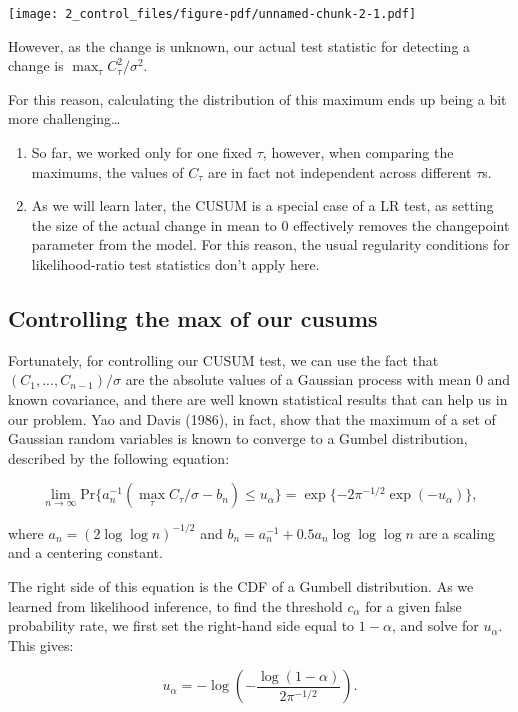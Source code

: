 \documentclass[
  letterpaper,
  DIV=11,
  numbers=noendperiod]{scrreprt}
\providecommand{\tightlist}{%
  \setlength{\itemsep}{0pt}\setlength{\parskip}{0pt}}\usepackage{longtable,booktabs,array}
\begin{document}
\texttt{[image: 2\_control\_files/figure-pdf/unnamed-chunk-2-1.pdf]}

However, as the change is unknown, our actual test statistic for
detecting a change is \(\max_\tau C_\tau^2/σ^2\).

For this reason, calculating the distribution of this maximum ends up
being a bit more challenging\ldots{}

\begin{enumerate}
\def\labelenumi{\arabic{enumi}.}
\tightlist
\item
  So far, we worked only for one fixed \(\tau\), however, when comparing
  the maximums, the values of \(C_\tau\) are in fact not independent
  across different \(\tau\)s.
\item
  As we will learn later, the CUSUM is a special case of a LR test, as
  setting the size of the actual change in mean to 0 effectively removes
  the changepoint parameter from the model. For this reason, the usual
  regularity conditions for likelihood-ratio test statistics don't apply
  here.
\end{enumerate}

\subsection{Controlling the max of our
cusums}\label{controlling-the-max-of-our-cusums}

Fortunately, for controlling our CUSUM test, we can use the fact that
\((C_1, ..., C_{n-1})/ \sigma\) are the absolute values of a Gaussian
process with mean 0 and known covariance, and there are well known
statistical results that can help us in our problem. Yao and Davis
(1986), in fact, show that the maximum of a set of Gaussian random
variables is known to converge to a Gumbel distribution, described by
the following equation:

\[
\lim_{n→\infty} \text{Pr}\{a_n^{-1}(\max_\tau C_\tau/\sigma - b_n) ≤ u_\alpha\} = \exp\{-2π^{-1/2}\exp(-u_\alpha)\},
\]

where \(a_n = (2 \log \log n)^{-1/2}\) and
\(b_n = a_n^{-1} + 0.5a_n \log \log \log n\) are a scaling and a
centering constant.

The right side of this equation is the CDF of a Gumbell distribution. As
we learned from likelihood inference, to find the threshold
\(c_{\alpha}\) for a given false probability rate, we first set the
right-hand side equal to \(1 - \alpha\), and solve for \(u_\alpha\).
This gives:

\[
u_\alpha = -\log\left( -\frac{\log(1-\alpha)}{2\pi^{-1/2}} \right).
\]
\end{document}
